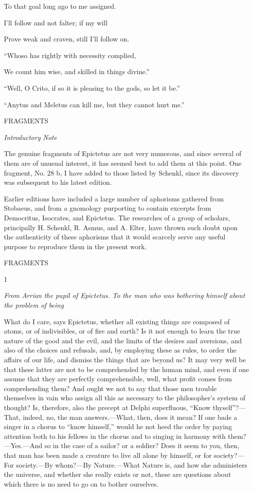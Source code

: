 To that goal long ago to me assigned.

I'll follow and not falter; if my will

Prove weak and craven, still I'll follow on.

``Whoso has rightly with necessity complied,

We count him wise, and skilled in things divine.''

``Well, O Crito, if so it is pleasing to the gods, so let it be.''

``Anytus and Meletus can kill me, but they cannot hurt me.''



FRAGMENTS

\emph{Introductory Note}

The genuine fragments of Epictetus are not very numerous, and since several of them are of unusual interest, it has seemed best to add them at this point. One fragment, No. 28 b, I have added to those listed by Schenkl, since its discovery was subsequent to his latest edition.

Earlier editions have included a large number of aphorisms gathered from Stobaeus, and from a gnomology purporting to contain excerpts from Democritus, Isocrates, and Epictetus. The researches of a group of scholars, principally H. Schenkl, R. Asmus, and A. Elter, have thrown such doubt upon the authenticity of these aphorisms that it would scarcely serve any useful purpose to reproduce them in the present work.

FRAGMENTS

1

\emph{From Arrian the pupil of Epictetus. To the man who was bothering himself about the problem of being}

What do I care, says Epictetus, whether all existing things are composed of atoms, or of indivisibles, or of fire and earth? Is it not enough to learn the true nature of the good and the evil, and the limits of the desires and aversions, and also of the choices and refusals, and, by employing these as rules, to order the affairs of our life, and dismiss the things that are beyond us? It may very well be that these latter are not to be comprehended by the human mind, and even if one assume that they are perfectly comprehensible, well, what profit comes from comprehending them? And ought we not to say that those men trouble themselves in vain who assign all this as necessary to the philosopher's system of thought? Is, therefore, also the precept at Delphi superfluous, ``Know thyself''?—That, indeed, no, the man answers.—What, then, does it mean? If one bade a singer in a chorus to ``know himself,'' would he not heed the order by paying attention both to his fellows in the chorus and to singing in harmony with them?—Yes.—And so in the case of a sailor? or a soldier? Does it seem to you, then, that man has been made a creature to live all alone by himself, or for society?—For society.—By whom?—By Nature.—What Nature is, and how she administers the universe, and whether she really exists or not, these are questions about which there is no need to go on to bother ourselves.

